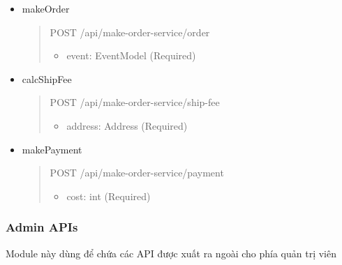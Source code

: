 \begin{itemize}
	\item makeOrder
	\begin{quote}
		POST /api/make-order-service/order
		\begin{itemize}
			\item event: EventModel (Required)
		\end{itemize}
	\end{quote}

	\item calcShipFee
	\begin{quote}
		POST /api/make-order-service/ship-fee
		\begin{itemize}
			\item address: Address (Required)
		\end{itemize}
	\end{quote}

	\item makePayment
	\begin{quote}
		POST /api/make-order-service/payment
		\begin{itemize}
			\item cost: int (Required)
		\end{itemize}
	\end{quote}
\end{itemize}




\subsubsection{Admin APIs}
Module này dùng để chứa các API được xuất ra ngoài cho phía quản trị viên

